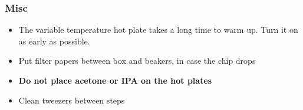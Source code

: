 \subsubsection{Misc}
\begin{itemize}
\item The variable temperature hot plate takes a long time to warm up. Turn it on as early as possible.
\item Put filter papers between box and beakers, in case the chip drops
\item \textbf{Do not place acetone or IPA on the hot plates}
\item Clean tweezers between steps
\end{itemize}

\newpage

